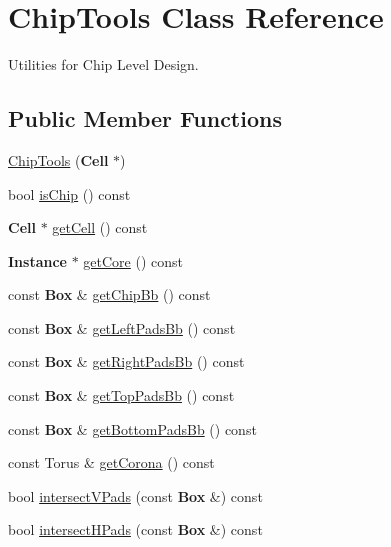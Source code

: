 \hypertarget{classKatabatic_1_1ChipTools}{\section{Chip\-Tools Class Reference}
\label{classKatabatic_1_1ChipTools}
}


Utilities for Chip Level Design.  


\subsection*{Public Member Functions}
\begin{DoxyCompactItemize}
\item 
\hyperlink{classKatabatic_1_1ChipTools_a5296f5ccb380869255d774b70e237686}{Chip\-Tools} ({\bf Cell} $\ast$)
\item 
bool \hyperlink{classKatabatic_1_1ChipTools_a390b4da0f5d92dc7586dbb35fb33f105}{is\-Chip} () const 
\item 
{\bf Cell} $\ast$ \hyperlink{classKatabatic_1_1ChipTools_a148fdf09f18e7adb39a73c747f165266}{get\-Cell} () const 
\item 
{\bf Instance} $\ast$ \hyperlink{classKatabatic_1_1ChipTools_a9b0b85c44c108a2a17a01d86f17e1db9}{get\-Core} () const 
\item 
const {\bf Box} \& \hyperlink{classKatabatic_1_1ChipTools_a31b90ca92688051b3a99b1adc13fa311}{get\-Chip\-Bb} () const 
\item 
const {\bf Box} \& \hyperlink{classKatabatic_1_1ChipTools_ab211c70912b6a16c03ca1e2e06c90b0b}{get\-Left\-Pads\-Bb} () const 
\item 
const {\bf Box} \& \hyperlink{classKatabatic_1_1ChipTools_ae6f1937b84779a9d96fc08f0d5752390}{get\-Right\-Pads\-Bb} () const 
\item 
const {\bf Box} \& \hyperlink{classKatabatic_1_1ChipTools_aa21203c8ef37b4f3e4e82e6cc1ef8c64}{get\-Top\-Pads\-Bb} () const 
\item 
const {\bf Box} \& \hyperlink{classKatabatic_1_1ChipTools_aaff5b9fb64c2344b6ab0aaf5e5e36caf}{get\-Bottom\-Pads\-Bb} () const 
\item 
const Torus \& \hyperlink{classKatabatic_1_1ChipTools_a3db402fb2e0839749fe524882d77eddd}{get\-Corona} () const 
\item 
bool \hyperlink{classKatabatic_1_1ChipTools_a2aea3372bc7e8ec1d0a70681544d8202}{intersect\-V\-Pads} (const {\bf Box} \&) const 
\item 
bool \hyperlink{classKatabatic_1_1ChipTools_a6af8e197289a2a6c5e3aab0a658c4969}{intersect\-H\-Pads} (const {\bf Box} \&) const 
\end{DoxyCompactItemize}


